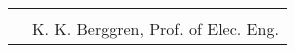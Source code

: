 \documentclass[]{article}
\begin{document}
\vspace{15 mm}
\begin{tabular}{@{}p{1.5in}p{4in}@{}}
  & \hrulefill \\
& K. K. Berggren, Prof. of Elec. Eng.
\end{tabular}

\newpage

\tableofcontents

\listoffigures

\newpage







\newpage

% 
\begin{sloppypar}
\printbibliography
\end{sloppypar}
\end{document}
